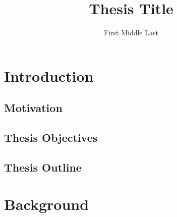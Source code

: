 \documentclass[chapterbib]{ualberta}
\title{Thesis Title}              %
\author{First Middle Last}        %
\begin{document}
 \maketitle                    %
 \makeabstract                 %
 \makepreface                  %
 \acknowledgements             %
 \tableofcontents              %
 \listoftables                 %
 \listoffigures                %
 \bodyoftext                   %

 \truedoublespacing

\chapter{Introduction}\label{ch:Introduction}
  \lipsum[6-8]
  \section{Motivation}\label{sec:Motivation}
    \lipsum[1-3]
  \section{Thesis Objectives}\label{sec:thesisObjective}
    \lipsum[14-16]
  \section{Thesis Outline}\label{sec:thesisOutline}
    \lipsum[17]
                
\chapter{Background}\label{ch:Background}
\end{document}
